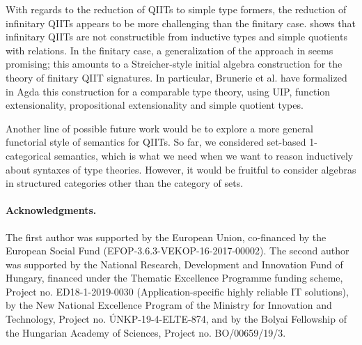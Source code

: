 \documentclass{article}
\theoremstyle{definition}
\theoremstyle{theorem}
\begin{document}
With regards to the reduction of QIITs to simple type formers, the reduction of
infinitary QIITs appears to be more challenging than the finitary
case. \cite[Section 9]{lumsdaineShulman} shows that infinitary QIITs are not
constructible from inductive types and simple quotients with relations. In the
finitary case, a generalization of the approach in \cite{induction-is-enough}
seems promising; this amounts to a Streicher-style initial algebra construction
\cite{streicher2012semantics} for the theory of finitary QIIT signatures. In
particular, Brunerie et al. \cite{brunerie} have formalized in Agda this
construction for a comparable type theory, using UIP, function extensionality,
propositional extensionality and simple quotient types.

Another line of possible future work would be to explore a more general
functorial style of semantics for QIITs. So far, we considered set-based
1-categorical semantics, which is what we need when we want to reason
inductively about syntaxes of type theories. However, it would be fruitful to
consider algebras in structured categories other than the category of sets.

\paragraph{Acknowledgments.}The first author was supported by the European Union,
co-financed by the European Social Fund (EFOP-3.6.3-VEKOP-16-2017-00002). The
second author was supported by the National Research, Development and Innovation
Fund of Hungary, financed under the Thematic Excellence Programme funding
scheme, Project no. ED18-1-2019-0030 (Application-specific highly reliable IT
solutions), by the New National Excellence Program of the Ministry for
Innovation and Technology, Project no. \'UNKP-19-4-ELTE-874, and by the Bolyai
Fellowship of the Hungarian Academy of Sciences, Project no. BO/00659/19/3.


\end{document}
